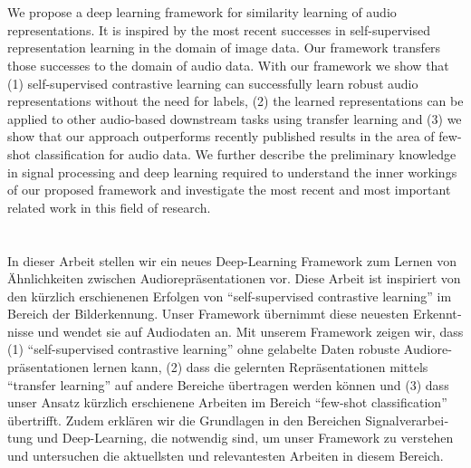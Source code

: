 \chapter*{\abstractname}

We propose a deep learning framework for similarity learning of audio representations. It is inspired by the most recent successes in self-supervised representation learning in the domain of image data. Our framework transfers those successes to the domain of audio data. With our framework we show that (1) self-supervised contrastive learning can successfully learn robust audio representations without the need for labels, (2) the learned representations can be applied to other audio-based downstream tasks using transfer learning and (3) we show that our approach outperforms recently published results in the area of few-shot classification for audio data. We further describe the preliminary knowledge in signal processing and deep learning required to understand the inner workings of our proposed framework and investigate the most recent and most important related work in this field of research.

\makeatletter
{}
{\renewcommand{\abstractname}{Kurzfassung}}
{\renewcommand{\abstractname}{Abstract}}
\makeatother

\chapter*{\abstractname}

\begin{otherlanguage}{ngerman}

In dieser Arbeit stellen wir ein neues Deep-Learning Framework zum Lernen von Ähnlichkeiten zwischen Audiorepräsentationen vor. Diese Arbeit ist inspiriert von den kürzlich erschienenen Erfolgen von ``self-supervised contrastive learning'' im Bereich der Bilderkennung. Unser Framework übernimmt diese neuesten Erkenntnisse und wendet sie auf Audiodaten an. Mit unserem Framework zeigen wir, dass (1) ``self-supervised contrastive learning'' ohne gelabelte Daten robuste Audiorepräsentationen lernen kann, (2) dass die gelernten Repräsentationen mittels ``transfer learning'' auf andere Bereiche übertragen werden können und (3) dass unser Ansatz kürzlich erschienene Arbeiten im Bereich ``few-shot classification'' übertrifft. Zudem erklären wir die Grundlagen in den Bereichen Signalverarbeitung und Deep-Learning, die notwendig sind, um unser Framework zu verstehen und untersuchen die aktuellsten und relevantesten Arbeiten in diesem Bereich.

\end{otherlanguage}


\makeatletter
{}
{\renewcommand{\abstractname}{Abstract}}
{\renewcommand{\abstractname}{Kurzfassung}}
\makeatother